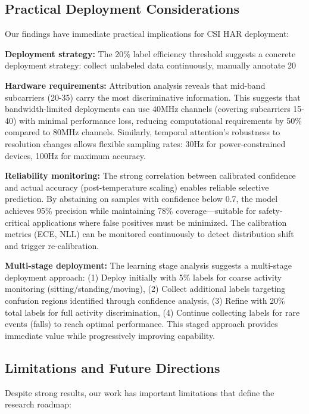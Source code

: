 \documentclass[journal]{IEEEtran}
\begin{document}
\subsection{Practical Deployment Considerations}
Our findings have immediate practical implications for CSI HAR deployment:

\textbf{Deployment strategy:} The 20\% label efficiency threshold suggests a concrete deployment strategy: collect unlabeled data continuously, manually annotate 20%

\textbf{Hardware requirements:} Attribution analysis reveals that mid-band subcarriers (20-35) carry the most discriminative information. This suggests that bandwidth-limited deployments can use 40MHz channels (covering subcarriers 15-40) with minimal performance loss, reducing computational requirements by 50\% compared to 80MHz channels. Similarly, temporal attention's robustness to resolution changes allows flexible sampling rates: 30Hz for power-constrained devices, 100Hz for maximum accuracy.

\textbf{Reliability monitoring:} The strong correlation between calibrated confidence and actual accuracy (post-temperature scaling) enables reliable selective prediction. By abstaining on samples with confidence below 0.7, the model achieves 95\% precision while maintaining 78\% coverage—suitable for safety-critical applications where false positives must be minimized. The calibration metrics (ECE, NLL) can be monitored continuously to detect distribution shift and trigger re-calibration.

\textbf{Multi-stage deployment:} The learning stage analysis suggests a multi-stage deployment approach: (1) Deploy initially with 5\% labels for coarse activity monitoring (sitting/standing/moving), (2) Collect additional labels targeting confusion regions identified through confidence analysis, (3) Refine with 20\% total labels for full activity discrimination, (4) Continue collecting labels for rare events (falls) to reach optimal performance. This staged approach provides immediate value while progressively improving capability.

\subsection{Limitations and Future Directions}
Despite strong results, our work has important limitations that define the research roadmap:
\end{document}
